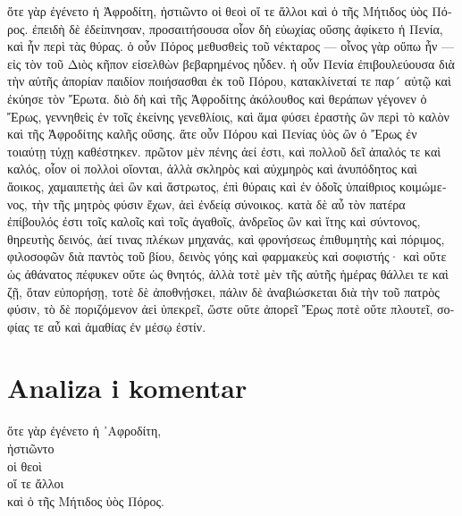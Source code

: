 {\large

\begin{greek}

\noindent ὅτε γὰρ ἐγένετο ἡ Ἀφροδίτη, ἡστιῶντο οἱ θεοὶ οἵ τε ἄλλοι καὶ ὁ τῆς Μήτιδος ὑὸς Πόρος. ἐπειδὴ δὲ ἐδείπνησαν, προσαιτήσουσα οἷον δὴ εὐωχίας οὔσης ἀφίκετο ἡ Πενία, καὶ ἦν περὶ τὰς θύρας. ὁ οὖν Πόρος μεθυσθεὶς τοῦ νέκταρος — οἶνος γὰρ οὔπω ἦν — εἰς τὸν τοῦ Διὸς κῆπον εἰσελθὼν βεβαρημένος ηὗδεν. ἡ οὖν Πενία ἐπιβουλεύουσα διὰ τὴν αὑτῆς ἀπορίαν παιδίον ποιήσασθαι ἐκ τοῦ Πόρου, κατακλίνεταί τε παρ´ αὐτῷ καὶ ἐκύησε τὸν Ἔρωτα. διὸ δὴ καὶ τῆς Ἀφροδίτης ἀκόλουθος καὶ θεράπων γέγονεν ὁ Ἔρως, γεννηθεὶς ἐν τοῖς ἐκείνης γενεθλίοις, καὶ ἅμα φύσει ἐραστὴς ὢν περὶ τὸ καλὸν καὶ τῆς Ἀφροδίτης καλῆς οὔσης. ἅτε οὖν Πόρου καὶ Πενίας ὑὸς ὢν ὁ Ἔρως ἐν τοιαύτῃ τύχῃ καθέστηκεν. πρῶτον μὲν πένης ἀεί ἐστι, καὶ πολλοῦ δεῖ ἁπαλός τε καὶ καλός, οἷον οἱ πολλοὶ οἴονται, ἀλλὰ σκληρὸς καὶ αὐχμηρὸς καὶ ἀνυπόδητος καὶ ἄοικος, χαμαιπετὴς ἀεὶ ὢν καὶ ἄστρωτος, ἐπὶ θύραις καὶ ἐν ὁδοῖς ὑπαίθριος κοιμώμενος, τὴν τῆς μητρὸς φύσιν ἔχων, ἀεὶ ἐνδείᾳ σύνοικος. κατὰ δὲ αὖ τὸν πατέρα ἐπίβουλός ἐστι τοῖς καλοῖς καὶ τοῖς ἀγαθοῖς, ἀνδρεῖος ὢν καὶ ἴτης καὶ σύντονος, θηρευτὴς δεινός, ἀεί τινας πλέκων μηχανάς, καὶ φρονήσεως ἐπιθυμητὴς καὶ πόριμος, φιλοσοφῶν διὰ παντὸς τοῦ βίου, δεινὸς γόης καὶ φαρμακεὺς καὶ σοφιστής· καὶ οὔτε ὡς ἀθάνατος πέφυκεν οὔτε ὡς θνητός, ἀλλὰ τοτὲ μὲν τῆς αὐτῆς ἡμέρας θάλλει τε καὶ ζῇ, ὅταν εὐπορήσῃ, τοτὲ δὲ ἀποθνῄσκει, πάλιν δὲ ἀναβιώσκεται διὰ τὴν τοῦ πατρὸς φύσιν, τὸ δὲ ποριζόμενον ἀεὶ ὑπεκρεῖ, ὥστε οὔτε ἀπορεῖ Ἔρως ποτὲ οὔτε πλουτεῖ, σοφίας τε αὖ καὶ ἀμαθίας ἐν μέσῳ ἐστίν.

\end{greek}

}


\section*{Analiza i komentar}


{\large
\begin{greek}
\noindent ὅτε γὰρ ἐγένετο ἡ ᾿Αφροδίτη, \\
ἡστιῶντο \\
οἱ θεοὶ \\
οἵ τε ἄλλοι \\
καὶ ὁ τῆς Μήτιδος ὑὸς Πόρος.\\

\end{greek}
}

\newpage

